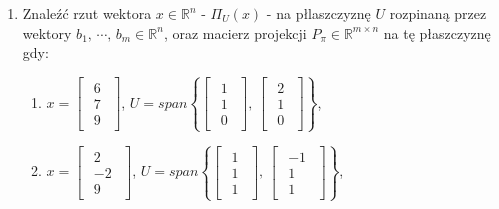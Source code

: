 \documentclass{article}
\begin{document}
\begin{enumerate}
    \item Znaleźć rzut wektora $x \in \mathbb{R}^{n}$ - $\Pi_{U}(x)$ -  na płlaszczyznę $U$ rozpinaną przez wektory $b_{1},\,\cdots,\,b_{m}  \in \mathbb{R}^{n}$, oraz macierz projekcji $P_{\pi} \in \mathbb{R}^{m \times n}$ na tę płaszczyznę gdy:
        \begin{enumerate}
            \item $x = \begin{bmatrix}\begin{array}{r} 6 \\ 7 \\ 9 \end{array}\end{bmatrix}$, $U = span \left\{ \begin{bmatrix}\begin{array}{r} 1 \\ 1\\ 0\end{array}\end{bmatrix},\, \begin{bmatrix}\begin{array}{r} 2 \\ 1\\ 0\end{array}\end{bmatrix} \right\}$,
            \item $x = \begin{bmatrix}\begin{array}{r} 2 \\ -2 \\ 9 \end{array}\end{bmatrix}$, $U = span \left\{ \begin{bmatrix}\begin{array}{r} 1 \\ 1\\ 1\end{array}\end{bmatrix},\, \begin{bmatrix}\begin{array}{r} -1 \\ 1\\ 1\end{array}\end{bmatrix} \right\}$,

\end{enumerate}
\end{enumerate}
\end{document}
